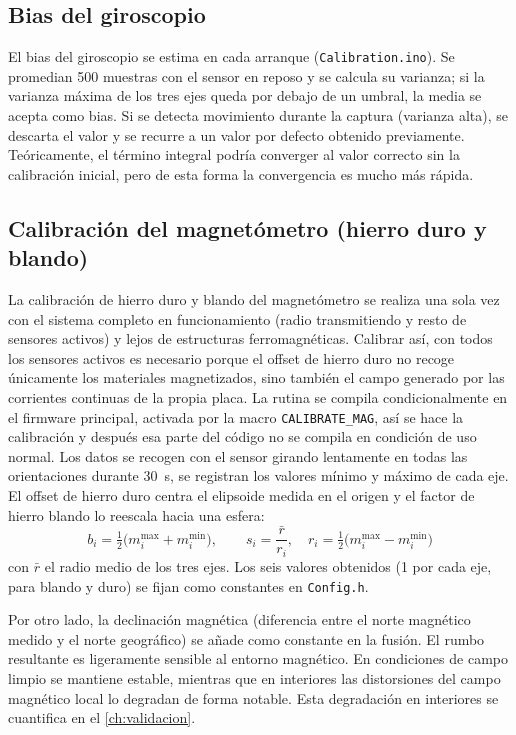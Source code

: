 \subsection{Bias del giroscopio}
\label{sec:fw_cal_gyro}

El bias del giroscopio se estima en cada arranque (\texttt{Calibration.ino}). Se
promedian \num{500} muestras con el sensor en reposo y se calcula su varianza;
si la varianza máxima de los tres ejes queda por debajo de un umbral, la media
se acepta como bias. Si se detecta movimiento durante la captura (varianza
alta), se descarta el valor y se recurre a un valor por defecto obtenido previamente.
Teóricamente, el término integral podría converger al valor correcto sin la calibración inicial, pero de esta forma la convergencia es mucho más rápida.

\subsection{Calibración del magnetómetro (hierro duro y blando)}
\label{sec:fw_cal_mag}

La calibración de hierro duro y blando del magnetómetro se realiza una sola vez
con el sistema completo en funcionamiento (radio transmitiendo y resto de
sensores activos) y lejos de estructuras ferromagnéticas. Calibrar así, con todos los sensores activos es
necesario porque el offset de hierro duro no recoge únicamente los materiales
magnetizados, sino también el campo generado por las corrientes continuas de la
propia placa. La rutina se compila condicionalmente en el firmware principal, activada por la macro
\texttt{CALIBRATE\_MAG}, así se hace la calibración y después esa parte del código no se compila en condición de uso normal. Los datos se recogen con el sensor girando lentamente en todas las orientaciones durante \SI{30}{\second}, se registran los valores mínimo y máximo
de cada eje. El offset de hierro duro centra el elipsoide medida en el origen
y el factor de hierro blando lo reescala hacia una esfera:
\begin{equation}
    b_i = \tfrac{1}{2}\bigl(m_i^{\max}+m_i^{\min}\bigr), \qquad
    s_i = \frac{\bar{r}}{r_i}, \quad
    r_i = \tfrac{1}{2}\bigl(m_i^{\max}-m_i^{\min}\bigr)
\end{equation}
con $\bar{r}$ el radio medio de los tres ejes. 
Los seis valores obtenidos (1 por cada eje, para blando y duro) se fijan como constantes en \texttt{Config.h}.

Por otro lado, la declinación magnética (diferencia entre el norte magnético medido y el norte
geográfico) se añade como constante en la fusión. El rumbo resultante es ligeramente sensible al entorno magnético. En condiciones de campo limpio se mantiene estable, mientras que en interiores las distorsiones del campo magnético local
lo degradan de forma notable. Esta degradación en interiores se cuantifica en el
\cref{ch:validacion}.


